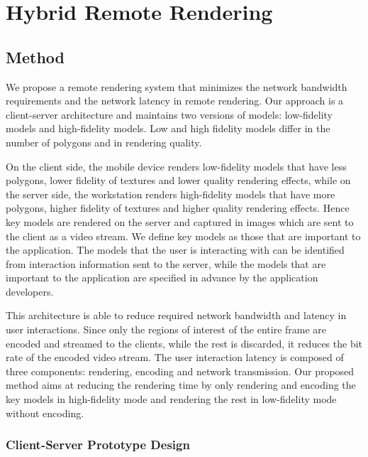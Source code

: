 \chapter{Hybrid Remote Rendering}
\label{chap:hrr}

\section{Method}

We propose a remote rendering system that minimizes the network bandwidth requirements and the network latency in remote rendering.
Our approach is a client-server architecture and maintains two versions of models: low-fidelity models and high-fidelity models.
Low and high fidelity models differ in the number of polygons and in rendering quality.

On the client side, the mobile device renders low-fidelity models that have less polygons, lower fidelity of textures and lower quality rendering effects, while on the server side, the workstation renders high-fidelity models that have more polygons, higher fidelity of textures and higher quality rendering effects. Hence key models are rendered on the server and captured in images which are sent to the client as a video stream. We define key models as those that are important to the application. The models that the user is interacting with can be identified from interaction information sent to the server, while the models that are important to the application are specified in advance by the application developers.

This architecture is able to reduce required network bandwidth and latency in user interactions.
Since only the regions of interest of the entire frame are encoded and streamed to the clients, while the rest is discarded, it reduces the bit rate of the encoded video stream.
The user interaction latency is composed of three components: rendering, encoding and network transmission. Our proposed method aims at reducing the rendering time by only rendering and encoding the key models in high-fidelity mode and rendering the rest in low-fidelity mode without encoding.

\subsection{Client-Server Prototype Design}

